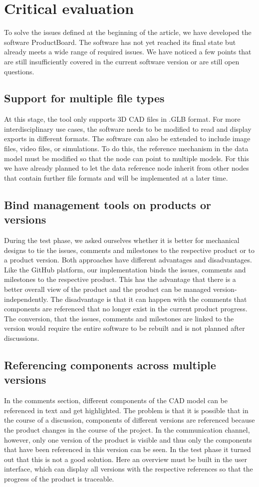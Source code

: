 \section{Critical evaluation}
\label{sec:evaluation}
To solve the issues defined at the beginning of the article, we have developed the software ProductBoard. The software has not yet reached its final state but already meets a wide range of required issues. We have noticed a few points that are still insufficiently covered in the current software version or are still open questions.

\subsection*{Support for multiple file types}
At this stage, the tool only supports 3D CAD files in .GLB format. For more interdisciplinary use cases, the software needs to be modified to read and display exports in different formats. The software can also be extended to include image files, video files, or simulations. To do this, the reference mechanism in the data model must be modified so that the node can point to multiple models. For this we have already planned to let the data reference node inherit from other nodes that contain further file formats and will be implemented at a later time.

\subsection*{Bind management tools on products or versions}
During the test phase, we asked ourselves whether it is better for mechanical designs to tie the issues, comments and milestones to the respective product or to a product version. Both approaches have different advantages and disadvantages. Like the GitHub platform, our implementation binds the issues, comments and milestones to the respective product. This has the advantage that there is a better overall view of the product and the product can be managed version-independently. The disadvantage is that it can happen with the comments that components are referenced that no longer exist in the current product progress. The conversion, that the issues, comments and milestones are linked to the version would require the entire software to be rebuilt and is not planned after discussions.

\subsection*{Referencing components across multiple versions}
In the comments section, different components of the CAD model can be referenced in text and get highlighted. The problem is that it is possible that in the course of a discussion, components of different versions are referenced because the product changes in the course of the project. In the communication channel, however, only one version of the product is visible and thus only the components that have been referenced in this version can be seen. In the test phase it turned out that this is not a good solution. Here an overview must be built in the user interface, which can display all versions with the respective references so that the progress of the product is traceable.


